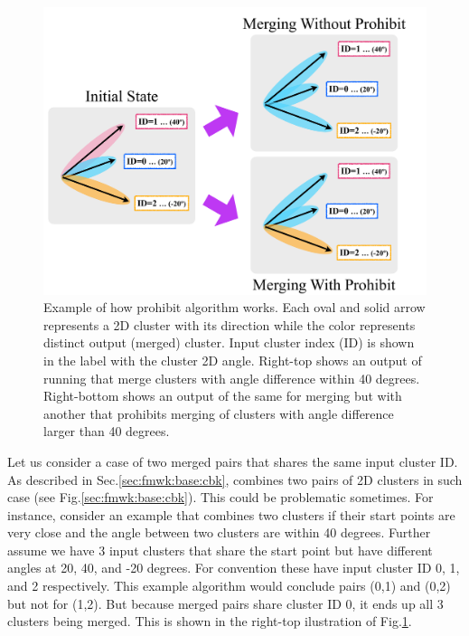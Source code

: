 \begin{figure}[ht]\begin{center}
\includegraphics[width=13cm]{./src/Pictures/MergeProhibitExample.pdf}
\caption{Example of how prohibit algorithm works. Each oval and solid arrow represents a 2D cluster with its direction while the color represents distinct output (merged) cluster. Input cluster index (ID) is shown in the label with the cluster 2D angle. Right-top shows an output of running {\cmalgo} that merge clusters with angle difference within 40 degrees. Right-bottom shows an output of the same {\cmalgo} for merging but with another {\cmalgo} that prohibits merging of clusters with angle difference larger than 40 degrees.}
\label{sec:fmwk:cmerge:merge_prohibit_example}
\end{center}\end{figure}
Let us consider a case of two merged pairs that shares the same input cluster ID. As described in Sec.\ref{sec:fmwk:base:cbk}, {\cbkeeper} combines two pairs of 2D clusters in such case (see Fig.\ref{sec:fmwk:base:cbk}). This could be problematic sometimes. For instance, consider an example {\cmalgo} that combines two clusters if their start points are very close and the angle between two clusters are within 40 degrees. Further assume we have 3 input clusters that share the start point but have different angles at 20, 40, and -20 degrees. For convention these have input cluster ID 0, 1, and 2 respectively. This example algorithm would conclude pairs (0,1) and (0,2) but not for (1,2). But because merged pairs share cluster ID 0, it ends up all 3 clusters being merged. This is shown in the right-top ilustration of Fig.\ref{sec:fmwk:cmerge:merge_prohibit_example}.

